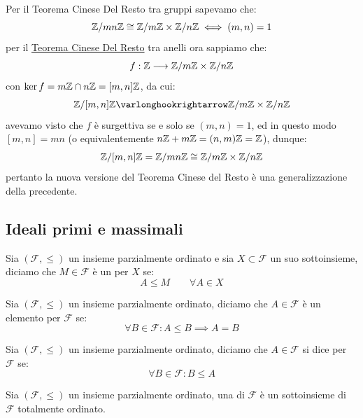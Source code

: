\documentclass[11pt]{scrartcl}
\begin{document}
\begin{remark}
    Per il Teorema Cinese Del Resto tra gruppi sapevamo che:
        \[ \mathbb{Z}/{mn}\mathbb{Z} \cong \mathbb{Z}/{m}\mathbb{Z} \times \mathbb{Z}/{n}\mathbb{Z} \iff (m,n) = 1
            \]
    per il \hyperref[t:cinese]{Teorema Cinese Del Resto} tra anelli ora sappiamo che:
        \[ f: \mathbb Z \longrightarrow \mathbb{Z}/{m}\mathbb{Z} \times \mathbb{Z}/{n}\mathbb{Z}
            \]
    con $\ker f = m\mathbb Z \cap n\mathbb Z = [m,n]\mathbb Z$, da cui:
        \[ \Z{[m,n]} \varlonghookrightarrow \Z{m} \times \Z{n}
            \]
    avevamo visto che $f$ è surgettiva se e solo se $(m,n) = 1$, ed in questo modo $[m,n] = mn$ (o equivalentemente $n\mathbb Z + m\mathbb Z = (n,m)\mathbb Z = \mathbb Z$), dunque:
        \[ \mathbb{Z}/{[m,n]}\mathbb{Z} = \mathbb{Z}/{mn}\mathbb{Z} \cong \mathbb{Z}/{m}\mathbb{Z} \times \mathbb{Z}/{n}\mathbb{Z}
            \]
    pertanto la nuova versione del Teorema Cinese del Resto è una generalizzazione della precedente.
\end{remark}

\newpage
\subsection{Ideali primi e massimali}

\begin{definition}
    Sia $(\mathcal{F}, \leqslant)$ un insieme parzialmente ordinato e sia $X \subset \mathcal{F}$ un suo sottoinsieme, diciamo che 
    $M \in \mathcal{F}$ è un  per $X$ se:
        \[ A \leqslant M \qquad \forall A \in X
            \]
\end{definition}

\begin{definition}
    Sia $(\mathcal{F}, \leqslant)$ un insieme parzialmente ordinato, diciamo che 
    $A \in \mathcal{F}$ è un elemento  per $\mathcal{F}$ se:
        \[ \forall B \in \mathcal{F} : A \leqslant B \implies A = B
            \]
\end{definition}

\begin{definition}
    Sia $(\mathcal{F}, \leqslant)$ un insieme parzialmente ordinato, diciamo che 
    $A \in \mathcal{F}$ si dice  per $\mathcal{F}$ se:
    \[ \forall B \in \mathcal{F} : B \leqslant A
        \]
\end{definition}

\begin{definition}
    Sia $(\mathcal{F}, \leqslant)$ un insieme parzialmente ordinato, una  di $\mathcal{F}$ è un sottoinsieme di $\mathcal{F}$ totalmente 
    ordinato.
\end{definition}
\end{document}
